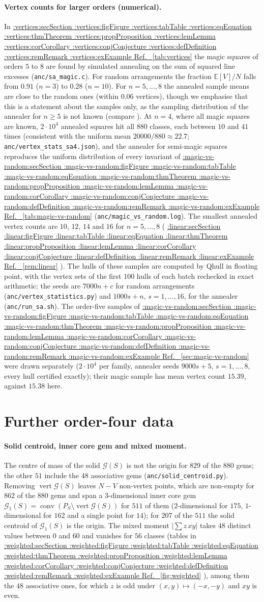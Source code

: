 \documentclass[11pt,a4paper]{article}
\makeatletter
\def\Cref@getprefix#1:#2\relax{#1}
\def\Cref@prefix@sec{sec}
\def\Cref@prefix@fig{fig}
\def\Cref@prefix@tab{tab}
\def\Cref@prefix@eq{eq}
\def\Cref@prefix@thm{thm}
\def\Cref@prefix@prop{prop}
\def\Cref@prefix@lem{lem}
\def\Cref@prefix@cor{cor}
\def\Cref@prefix@conj{conj}
\def\Cref@prefix@def{def}
\def\Cref@prefix@rem{rem}
\def\Cref@prefix@ex{ex}
\def\Cref@type@cap#1{%
  \edef\Cref@tmp{#1}%
  \ifx\Cref@tmp\Cref@prefix@sec Section%
  \else\ifx\Cref@tmp\Cref@prefix@fig Figure%
  \else\ifx\Cref@tmp\Cref@prefix@tab Table%
  \else\ifx\Cref@tmp\Cref@prefix@eq Equation%
  \else\ifx\Cref@tmp\Cref@prefix@thm Theorem%
  \else\ifx\Cref@tmp\Cref@prefix@prop Proposition%
  \else\ifx\Cref@tmp\Cref@prefix@lem Lemma%
  \else\ifx\Cref@tmp\Cref@prefix@cor Corollary%
  \else\ifx\Cref@tmp\Cref@prefix@conj Conjecture%
  \else\ifx\Cref@tmp\Cref@prefix@def Definition%
  \else\ifx\Cref@tmp\Cref@prefix@rem Remark%
  \else\ifx\Cref@tmp\Cref@prefix@ex Example%
  \else Ref.%
  \fi\fi\fi\fi\fi\fi\fi\fi\fi\fi\fi\fi
}
\DeclareRobustCommand{\Cref}[1]{%
  \begingroup
  \edef\Cref@label{#1}%
  \edef\Cref@prefix{\expandafter\Cref@getprefix\Cref@label:\relax}%
  \hyperref[#1]{\Cref@type@cap{\Cref@prefix}~\ref*{#1}}%
  \endgroup
}
\theoremstyle{plain}
\theoremstyle{definition}
\theoremstyle{remark}
\makeatother
\begin{document}
\paragraph{Vertex counts for larger orders (numerical).}
\label{sec:vertexstats}
In \Cref{tab:vertices} the magic squares of orders $5$ to $8$ are found by simulated annealing on the sum of squared line excesses (\texttt{anc/sa\_magic.c}).
For random arrangements the fraction $\mathbb E[V]/N$ falls from $0.91$ ($n=3$) to $0.28$ ($n=10$).
For $n=5,\dots,8$ the annealed sample means are close to the random ones (within $0.06$ vertices), though we emphasise that this is a statement about the samples only, as the sampling distribution of the annealer for $n\ge5$ is not known (compare \cite{pinn1998number}).
At $n=4$, where all magic squares are known, $2\cdot10^4$ annealed squares hit all $880$ classes, each between $10$ and $41$ times (consistent with the uniform mean $20000/880\approx22.7$; \texttt{anc/vertex\_stats\_sa4.json}), and the annealer for semi-magic squares reproduces the uniform distribution of every invariant of \Cref{tab:magic-vs-random} (\texttt{anc/magic\_vs\_random.log}).
The smallest annealed vertex counts are $10$, $12$, $14$ and $16$ for $n=5,\dots,8$ (\Cref{rem:linear}).
The hulls of these samples are computed by Qhull in floating point, with the vertex sets of the first $100$ hulls of each batch rechecked in exact arithmetic; the seeds are $7000n+c$ for random arrangements (\texttt{anc/vertex\_statistics.py}) and $1000s+n$, $s=1,\dots,16$, for the annealer (\texttt{anc/run\_sa.sh}).
The order-five samples of \Cref{sec:magic-vs-random} were drawn separately ($2\cdot10^4$ per family, annealer seeds $9000s+5$, $s=1,\dots,8$, every hull certified exactly); their magic sample has mean vertex count $15.39$, against $15.38$ here.

\section{Further order-four data}
\label{sec:further4}

\paragraph{Solid centroid, inner core gem and mixed moment.}
The centre of mass of the solid $\mathcal G(S)$ is not the origin for $829$ of the $880$ gems; the other $51$ include the $48$ associative gems (\texttt{anc/solid\_centroid.py}).
Removing $\operatorname{vert}\mathcal G(S)$ leaves $N-V$ non-vertex points, which are non-empty for $862$ of the $880$ gems and span a $3$-dimensional inner core gem $\mathcal G_1(S)=\operatorname{conv}(P_S\setminus\operatorname{vert}\mathcal G(S))$ for $511$ of them ($2$-dimensional for $175$, $1$-dimensional for $162$ and a single point for $14$); for $207$ of the $511$ the solid centroid of $\mathcal G_1(S)$ is the origin.
The mixed moment $|\sum z\,xy|$ takes $48$ distinct values between $0$ and $60$ and vanishes for $56$ classes (tables in \Cref{fig:weighted}), among them the $48$ associative ones, for which $z$ is odd under $(x,y)\mapsto(-x,-y)$ and $xy$ is even.
\end{document}
